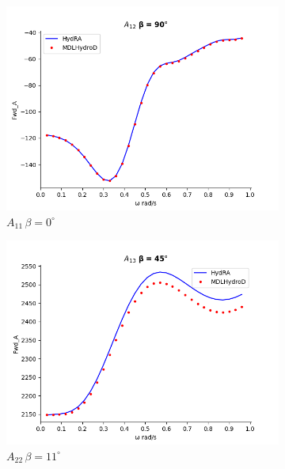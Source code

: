 \begin{figure}[H]
    \centering
    \ContinuedFloat
    \begin{subfigure}[b]{0.45\textwidth}
        \includegraphics[width=\textwidth]{plots/kcs/added_mass/A12_BETA_90.png}
        \caption{$A_{11}\, \beta=0^{\circ}$}
    \end{subfigure}
    \begin{subfigure}[b]{0.45\textwidth}
        \includegraphics[width=\textwidth]{plots/kcs/added_mass/A13_ BETA_45.png}
        \caption{$A_{22} \, \beta = 11^{\circ}$}
    \end{subfigure}
    \begin{subfigure}[b]{0.45\textwidth}

\end{subfigure}
\end{figure}

